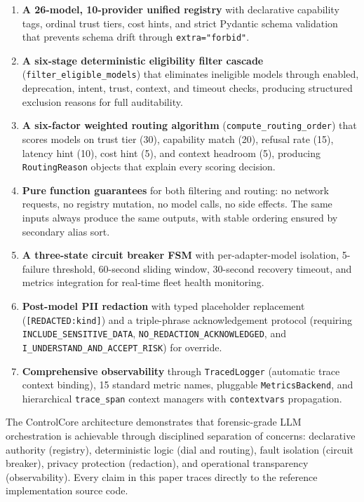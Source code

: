 \documentclass[11pt,a4paper]{article}
\theoremstyle{plain}
\theoremstyle{definition}
\begin{document}
\begin{enumerate}[leftmargin=2em]
\item \textbf{A 26-model, 10-provider unified registry} with declarative
  capability tags, ordinal trust tiers, cost hints, and strict Pydantic schema
  validation that prevents schema drift through \texttt{extra="forbid"}.

\item \textbf{A six-stage deterministic eligibility filter cascade}
  (\texttt{filter\_eligible\_models}) that eliminates ineligible models through
  enabled, deprecation, intent, trust, context, and timeout checks, producing
  structured exclusion reasons for full auditability.

\item \textbf{A six-factor weighted routing algorithm}
  (\texttt{compute\_routing\_order}) that scores models on trust tier (30),
  capability match (20), refusal rate (15), latency hint (10), cost hint (5),
  and context headroom (5), producing \texttt{RoutingReason} objects that
  explain every scoring decision.

\item \textbf{Pure function guarantees} for both filtering and routing: no
  network requests, no registry mutation, no model calls, no side effects.
  The same inputs always produce the same outputs, with stable ordering
  ensured by secondary alias sort.

\item \textbf{A three-state circuit breaker FSM} with per-adapter-model
  isolation, 5-failure threshold, 60-second sliding window, 30-second recovery
  timeout, and metrics integration for real-time fleet health monitoring.

\item \textbf{Post-model PII redaction} with typed placeholder replacement
  (\texttt{[REDACTED:kind]}) and a triple-phrase acknowledgement protocol
  (requiring \texttt{INCLUDE\_SENSITIVE\_DATA},
  \texttt{NO\_REDACTION\_ACKNOWLEDGED}, and
  \texttt{I\_UNDERSTAND\_AND\_ACCEPT\_RISK}) for override.

\item \textbf{Comprehensive observability} through \texttt{TracedLogger}
  (automatic trace context binding), 15 standard metric names, pluggable
  \texttt{MetricsBackend}, and hierarchical \texttt{trace\_span} context
  managers with \texttt{contextvars} propagation.
\end{enumerate}

The ControlCore architecture demonstrates that forensic-grade LLM orchestration
is achievable through disciplined separation of concerns: declarative authority
(registry), deterministic logic (dial and routing), fault isolation (circuit
breaker), privacy protection (redaction), and operational transparency
(observability). Every claim in this paper traces directly to the reference
implementation source code.
\end{document}
